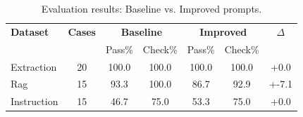 \begin{table}[h]
\centering
\caption{Evaluation results: Baseline vs. Improved prompts.}
\label{tab:eval-results}
\begin{tabular}{@{}lcccccc@{}}
\toprule
\textbf{Dataset} & \textbf{Cases} & \multicolumn{2}{c}{\textbf{Baseline}} & \multicolumn{2}{c}{\textbf{Improved}} & \textbf{$\Delta$} \\
 & & Pass\% & Check\% & Pass\% & Check\% & \\
\midrule
Extraction & 20 & 100.0 & 100.0 & 100.0 & 100.0 & +0.0 \\
Rag & 15 & 93.3 & 100.0 & 86.7 & 92.9 & +-7.1 \\
Instruction & 15 & 46.7 & 75.0 & 53.3 & 75.0 & +0.0 \\
\bottomrule
\end{tabular}
\end{table}

